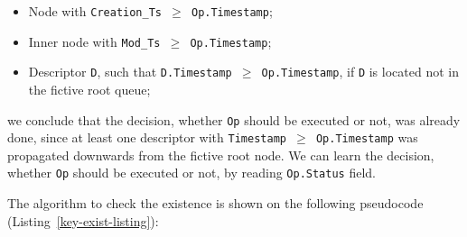 \documentclass[times, dvipsnames,%
               languages={russian,english} %
              ]{itmo-student-thesis}
\begin{document}
\begin{itemize}
    \item Node with \texttt{Creation\_Ts $\geq$ Op.Timestamp};
    
    \item Inner node with \texttt{Mod\_Ts $\geq$ Op.Timestamp};
    
    \item Descriptor \texttt{D}, such that \texttt{D.Timestamp $\geq$ Op.Timestamp}, if \texttt{D} is located not in the fictive root queue;
\end{itemize}

\bigbreak

we conclude that the decision, whether \texttt{Op} should be executed or not, was already done, since at least one descriptor with \texttt{Timestamp $\geq$ Op.Timestamp} was propagated downwards from the fictive root node. We can learn the decision, whether \texttt{Op} should be executed or not, by reading \texttt{Op.Status} field.

The algorithm to check the existence is shown on the following pseudocode (Listing~\ref{key-exist-listing}):
\end{document}
